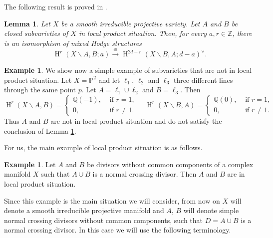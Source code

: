 \documentclass[11pt,a4paper]{amsart}
\renewcommand{\P}{\mathds{P}}
\newcommand{\Q}{\mathds{Q}}
\newcommand{\Z}{\mathds{Z}}
\DeclareMathOperator{\rH}{H}
\numberwithin{equation}{section}
\theoremstyle{plain}
\newtheorem{lem}[prop]{Lemma}
\theoremstyle{definition}
\newtheorem{ex}[prop]{Example}
\begin{document}
The following result is proved in \cite[Lemma 6.1.1]{BKV:Fihnf}.

\begin{lem}\label{lemm:1} Let $X$ be a smooth irreducible projective variety.
  Let $A$ and $B$ be closed
  subvarieties of $X$ in local product situation. Then, for every
  $a,r\in \Z$, there is an
  isomorphism of mixed Hodge structures
  \begin{displaymath}
    \rH^{r}(X\smallsetminus A,B;a)\xrightarrow{\cong}
    \rH^{2d-r}(X\smallsetminus B,A;d-a)^{\vee}.
  \end{displaymath}
\end{lem}

\begin{ex} We show now a simple example of subvarieties that are not
  in local product situation.  Let $X=\P^{2}$ and let $\ell_{1}$,
  $\ell_{2}$ and $\ell_{3}$ three different lines through the same
  point $p$. Let $A=\ell_{1}\cup \ell_{2}$ and $B=\ell_{3}$. Then
  \begin{displaymath}
    \rH^{r}(X\smallsetminus A,B)=
    \begin{cases}
      \Q(-1),&\text{ if }r=1,\\
      0,&\text{ if }r\not =1.
    \end{cases}
    \quad
    \rH^{r}(X\smallsetminus B,A)=
    \begin{cases}
      \Q(0),&\text{ if }r=1,\\
      0,&\text{ if }r\not =1.
    \end{cases}
  \end{displaymath}
  Thus $A$ and $B$ are not in local product situation and do not
  satisfy the conclusion of Lemma \ref{lemm:1}.
\end{ex}

For us, the main example of local product
  situation  is as follows. 
\begin{ex}\label{exm:1}
  Let $A$ and $B$ be divisors
  without common components of a complex manifold $X$ such that $A\cup B$ is a normal
  crossing divisor. Then $A$ and $B$ are in local product situation. 
\end{ex}

Since this example is the main situation we will consider, from now on
$X$ will denote a smooth irreducible projective manifold and $A$, $B$ will denote
simple normal crossing divisors without common components, such that $D=A\cup B$ is a normal
crossing divisor. In this case we will use the following terminology. 
\end{document}
